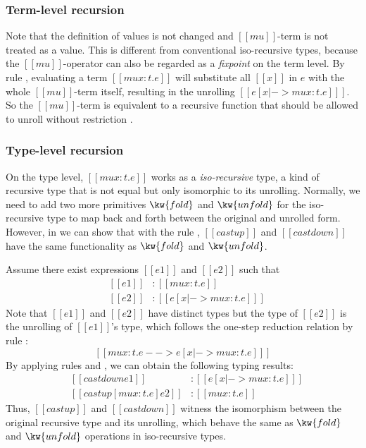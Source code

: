 \subsubsection{Term-level recursion}
Note that the definition of values is not changed and $[[mu]]$-term is not treated as a value. This is different from conventional iso-recursive types, because the $[[mu]]$-operator can also be regarded as a \emph{fixpoint} on the term level. By rule , evaluating a term $[[mu x:t.e]]$ will substitute all $[[x]]$ in $e$ with the whole $[[mu]]$-term itself, resulting in the unrolling $[[e [x |-> mu x:t.e] ]]$. So the $[[mu]]$-term is equivalent to a recursive function that should be allowed to unroll without restriction .

\subsubsection{Type-level recursion}
On the type level, $[[mu x:t.e]]$ works as a \emph{iso-recursive} type, a kind of recursive type that is not equal but only isomorphic to its unrolling. Normally, we need to add two more primitives $\kw{fold}$ and $\kw{unfold}$ for the iso-recursive type to map back and forth between the original and unrolled form. However, in \name we can show that with the rule , $[[castup]]$ and $[[castdown]]$ have the same functionality as $\kw{fold}$ and $\kw{unfold}$.

Assume there exist expressions $[[e1]]$ and $[[e2]]$ such that 
\[\begin{array}{lll}
	&[[e1]] &: [[mu x:t.e]]\\
	&[[e2]] &: [[e [x |-> mu x:t.e] ]]
\end{array}\]
Note that $[[e1]]$ and $[[e2]]$ have distinct types but the type of $[[e2]]$ is the unrolling of $[[e1]]$'s type, which follows the one-step reduction relation by rule :
\[ [[mu x:t.e --> e [x |-> mu x:t.e] ]] \]
By applying rules  and , we can obtain the following typing results:
\[\begin{array}{lll}
	&[[castdown e1]] &: [[e [x |-> mu x:t.e] ]]\\
	&[[castup [mu x:t.e] e2]] &: [[mu x:t.e]]
\end{array}\]
Thus, $[[castup]]$ and $[[castdown]]$ witness the isomorphism between the original recursive type and its unrolling, which behave the same as $\kw{fold}$ and $\kw{unfold}$ operations in iso-recursive types.

